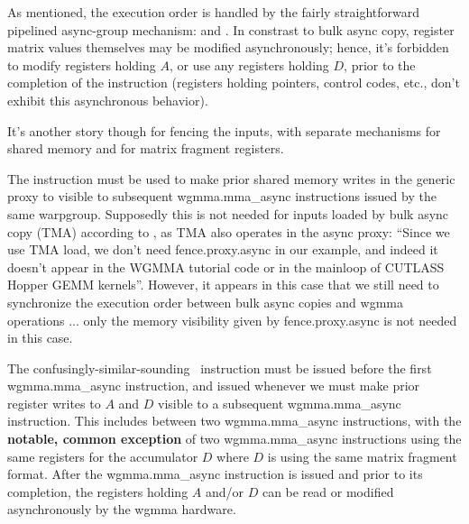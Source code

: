 \filbreak
As mentioned, the execution order is handled by the fairly straightforward pipelined async-group mechanism:  and .
In constrast to bulk async copy, register matrix values themselves may be modified asynchronously; hence, it's forbidden to modify registers holding $A$, or use any registers holding $D$, prior to the completion of the instruction (registers holding pointers, control codes, etc., don't exhibit this asynchronous behavior).

\filbreak
It's another story though for fencing the inputs, with separate mechanisms for shared memory and for matrix fragment registers.

\filbreak
{} The  instruction must be used to make prior shared memory writes in the generic proxy to visible to subsequent wgmma.mma\_async instructions issued by the same warpgroup.
Supposedly this is not needed for inputs loaded by bulk async copy (TMA) according to , as TMA also operates in the async proxy: ``Since we use TMA load, we don’t need fence.proxy.async in our example, and indeed it doesn’t appear in the WGMMA tutorial code or in the mainloop of CUTLASS Hopper GEMM kernels''.
However, it appears in this case that we still need to synchronize the execution order between bulk async copies and wgmma operations ... only the memory visibility given by fence.proxy.async is not needed in this case.

\filbreak
{} The confusingly-similar-sounding \wgmmaFence\ instruction must be issued before the first wgmma.mma\_async instruction, and issued whenever we must make prior register writes to $A$ and $D$ visible to a subsequent wgmma.mma\_async instruction.
This includes between two wgmma.mma\_async instructions, with the \textbf{notable, common exception} of two wgmma.mma\_async instructions using the same registers for the accumulator $D$ where $D$ is using the same matrix fragment format.
After the wgmma.mma\_async instruction is issued and prior to its completion, the registers holding $A$ and/or $D$ can be read or modified asynchronously by the wgmma hardware.

